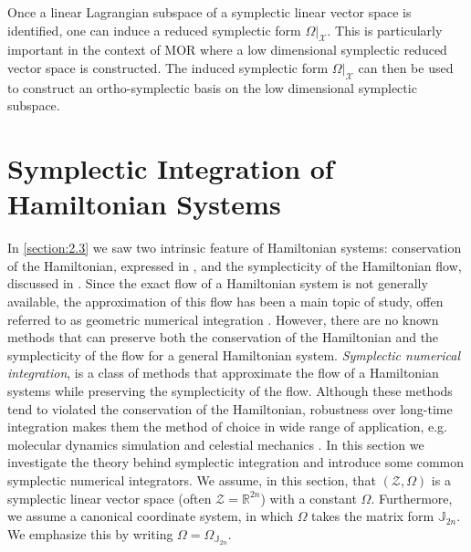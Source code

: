 Once a linear Lagrangian subspace of a symplectic linear vector space is identified, one can induce a reduced symplectic form $\Omega|_{\mathcal X}$. This is particularly important in the context of MOR where a low dimensional symplectic reduced vector space is constructed. The induced symplectic form $\Omega|_{\mathcal X}$ can then be used to construct an ortho-symplectic basis on the low dimensional symplectic subspace.

\section{Symplectic Integration of Hamiltonian Systems}
In \cref{section:2.3} we saw two intrinsic feature of Hamiltonian systems: conservation of the Hamiltonian, expressed in , and the symplecticity of the Hamiltonian flow, discussed in . Since the exact flow of a Hamiltonian system is not generally available, the approximation of this flow has been a main topic of study, offen referred to as geometric numerical integration \cite{hairer2006geometric,blanes2016concise}. However, there are no known methods that can preserve both the conservation of the Hamiltonian and the symplecticity of the flow for a general Hamiltonian system. \emph{Symplectic numerical integration}, is a class of methods that approximate the flow of a Hamiltonian systems while preserving the symplecticity of the flow. Although these methods tend to violated the conservation of the Hamiltonian, robustness over long-time integration makes them the method of choice in wide range of application, e.g. molecular dynamics simulation \cite{farantos2014nonlinear} and celestial mechanics \cite{schutz2004statistical}. In this section we investigate the theory behind symplectic integration and introduce some common symplectic numerical integrators. We assume, in this section, that $(\mathcal Z, \Omega)$ is a symplectic linear vector space (often $\mathcal Z = \mathbb R^{2n}$) with a constant $\Omega$. Furthermore, we assume a canonical coordinate system, in which $\Omega$ takes the matrix form $\mathbb J_{2n}$. We emphasize this by writing $\Omega = \Omega_{\mathbb J_{2n}}$.

